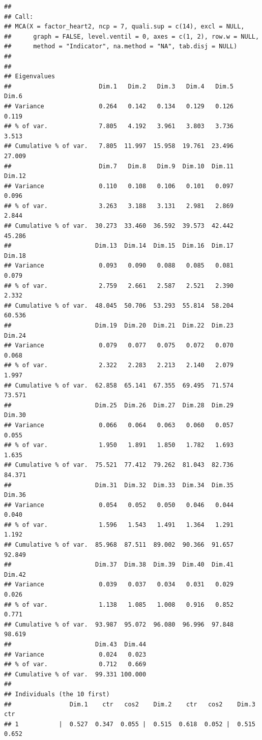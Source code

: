 \documentclass[]{article}
\begin{document}
\begin{verbatim}
## 
## Call:
## MCA(X = factor_heart2, ncp = 7, quali.sup = c(14), excl = NULL,  
##      graph = FALSE, level.ventil = 0, axes = c(1, 2), row.w = NULL,  
##      method = "Indicator", na.method = "NA", tab.disj = NULL) 
## 
## 
## Eigenvalues
##                        Dim.1   Dim.2   Dim.3   Dim.4   Dim.5   Dim.6
## Variance               0.264   0.142   0.134   0.129   0.126   0.119
## % of var.              7.805   4.192   3.961   3.803   3.736   3.513
## Cumulative % of var.   7.805  11.997  15.958  19.761  23.496  27.009
##                        Dim.7   Dim.8   Dim.9  Dim.10  Dim.11  Dim.12
## Variance               0.110   0.108   0.106   0.101   0.097   0.096
## % of var.              3.263   3.188   3.131   2.981   2.869   2.844
## Cumulative % of var.  30.273  33.460  36.592  39.573  42.442  45.286
##                       Dim.13  Dim.14  Dim.15  Dim.16  Dim.17  Dim.18
## Variance               0.093   0.090   0.088   0.085   0.081   0.079
## % of var.              2.759   2.661   2.587   2.521   2.390   2.332
## Cumulative % of var.  48.045  50.706  53.293  55.814  58.204  60.536
##                       Dim.19  Dim.20  Dim.21  Dim.22  Dim.23  Dim.24
## Variance               0.079   0.077   0.075   0.072   0.070   0.068
## % of var.              2.322   2.283   2.213   2.140   2.079   1.997
## Cumulative % of var.  62.858  65.141  67.355  69.495  71.574  73.571
##                       Dim.25  Dim.26  Dim.27  Dim.28  Dim.29  Dim.30
## Variance               0.066   0.064   0.063   0.060   0.057   0.055
## % of var.              1.950   1.891   1.850   1.782   1.693   1.635
## Cumulative % of var.  75.521  77.412  79.262  81.043  82.736  84.371
##                       Dim.31  Dim.32  Dim.33  Dim.34  Dim.35  Dim.36
## Variance               0.054   0.052   0.050   0.046   0.044   0.040
## % of var.              1.596   1.543   1.491   1.364   1.291   1.192
## Cumulative % of var.  85.968  87.511  89.002  90.366  91.657  92.849
##                       Dim.37  Dim.38  Dim.39  Dim.40  Dim.41  Dim.42
## Variance               0.039   0.037   0.034   0.031   0.029   0.026
## % of var.              1.138   1.085   1.008   0.916   0.852   0.771
## Cumulative % of var.  93.987  95.072  96.080  96.996  97.848  98.619
##                       Dim.43  Dim.44
## Variance               0.024   0.023
## % of var.              0.712   0.669
## Cumulative % of var.  99.331 100.000
## 
## Individuals (the 10 first)
##                Dim.1    ctr   cos2    Dim.2    ctr   cos2    Dim.3    ctr
## 1           |  0.527  0.347  0.055 |  0.515  0.618  0.052 |  0.515  0.652

\end{verbatim}
\end{document}
